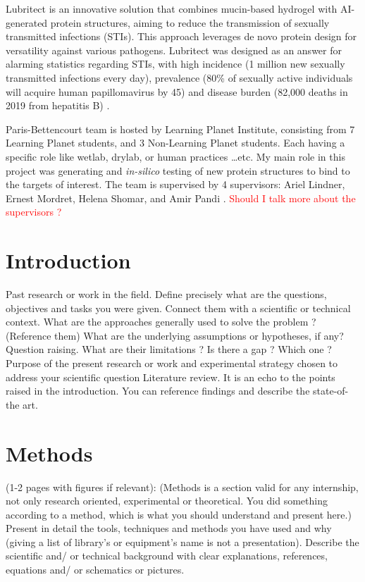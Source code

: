 \documentclass[11pt,a4paper]{article}
\begin{document}
Lubritect is an innovative solution that combines mucin-based hydrogel 
with AI-generated protein structures, aiming to reduce the transmission 
of sexually transmitted infections (STIs). This approach leverages de novo 
protein design for versatility against various pathogens. Lubritect was designed
as an answer for alarming statistics regarding STIs, with high incidence 
(1 million new sexually transmitted infections every day), 
prevalence (80\% of sexually active individuals will acquire human papillomavirus by 45)
and disease burden (82,000 deaths in 2019 from hepatitis B) \cite{paris_bettencourt_project}.

Paris-Bettencourt team is hosted by Learning Planet Institute,
consisting from 7 Learning Planet students, and 3 Non-Learning Planet students.
Each having a specific role like wetlab, drylab, or human practices \ldots etc. 
My main role in this project was generating and \emph{in-silico} testing of new protein structures to bind to the targets of interest.
The team is supervised by 4 supervisors: Ariel Lindner, Ernest Mordret, Helena 
Shomar, and Amir Pandi \cite{paris_bettencourt_team}.
\textcolor{red}{Should I talk more about the supervisors ?}



\section{Introduction}
\begin{displayquote}
    Past research or work in the field.
    Define precisely what are the questions, objectives and tasks you were given. Connect them with a scientific or technical context.
    What are the approaches generally used to solve the problem ? (Reference them)
    What are the underlying assumptions or hypotheses, if any?
    Question raising.
    What are their limitations ? 
    Is there a gap ? Which one ?
    Purpose of the present research or work and experimental strategy chosen to address your scientific question
    Literature review.
    It is an echo to the points raised in the introduction. You can reference findings and describe the state-of-the art.
\end{displayquote}


\section{Methods}
\begin{displayquote}
    (1-2 pages with figures if relevant): (Methods is a section valid for any internship, not only research oriented, experimental or theoretical. You did something according to a method, which is what you should understand and present here.)
Present in detail the tools, techniques and methods you have used and why (giving a list of library’s or equipment’s name is not a presentation). 
Describe the scientific and/ or technical background with clear explanations, references, equations and/ or schematics or pictures. 
\end{displayquote}
\end{document}
